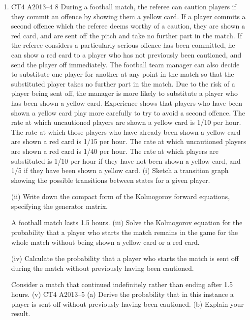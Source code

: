 \documentclass[a4paper,12pt]{article}
\begin{document}
\begin{enumerate}
\item 


CT4 A2013–4
8
During a football match, the referee can caution players if they commit an offence by
showing them a yellow card. If a player commits a second offence which the referee
deems worthy of a caution, they are shown a red card, and are sent off the pitch and
take no further part in the match. If the referee considers a particularly serious
offence has been committed, he can show a red card to a player who has not
previously been cautioned, and send the player off immediately.
The football team manager can also decide to substitute one player for another at any
point in the match so that the substituted player takes no further part in the match.
Due to the risk of a player being sent off, the manager is more likely to substitute a
player who has been shown a yellow card. Experience shows that players who have
been shown a yellow card play more carefully to try to avoid a second offence.
The rate at which uncautioned players are shown a yellow card is 1/10 per hour.
The rate at which those players who have already been shown a yellow card are
shown a red card is 1/15 per hour.
The rate at which uncautioned players are shown a red card is 1/40 per hour.
The rate at which players are substituted is 1/10 per hour if they have not been shown
a yellow card, and 1/5 if they have been shown a yellow card.
(i) Sketch a transition graph showing the possible transitions between states for a
given player.

(ii) Write down the compact form of the Kolmogorov forward equations,
specifying the generator matrix.

A football match lasts 1.5 hours.
(iii) Solve the Kolmogorov equation for the probability that a player who starts the
match remains in the game for the whole match without being shown a yellow
card or a red card.

(iv) Calculate the probability that a player who starts the match is sent off during
the match without previously having been cautioned.

Consider a match that continued indefinitely rather than ending after 1.5 hours.
(v)
CT4 A2013–5
(a) Derive the probability that in this instance a player is sent off without
previously having been cautioned.
(b) Explain your result.



\end{enumerate}
\end{document}
